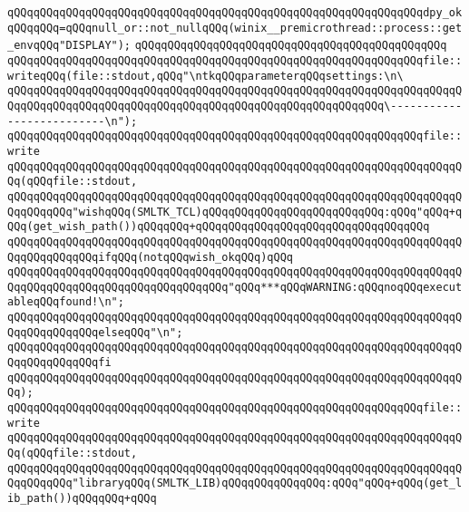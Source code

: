 \verb|qQQqqQQqqQQqqQQqqQQqqQQqqQQqqQQqqQQqqQQqqQQqqQQqqQQqqQQqqQQqqQQqdpy_okqQQqqQQq=qQQqnull_or::not_nullqQQq(winix__premicrothread::process::get_envqQQq"DISPLAY");|\newline
\verb|qQQqqQQqqQQqqQQqqQQqqQQqqQQqqQQqqQQqqQQqqQQqqQQq|\newline
\verb|qQQqqQQqqQQqqQQqqQQqqQQqqQQqqQQqqQQqqQQqqQQqqQQqqQQqqQQqqQQqqQQqfile::writeqQQq(file::stdout,qQQq"\ntkqQQqparameterqQQqsettings:\n\|\newline
\verb|qQQqqQQqqQQqqQQqqQQqqQQqqQQqqQQqqQQqqQQqqQQqqQQqqQQqqQQqqQQqqQQqqQQqqQQqqQQqqQQqqQQqqQQqqQQqqQQqqQQqqQQqqQQqqQQqqQQqqQQqqQQqqQQq\--------------------------\n");|\newline
\newline
\verb|qQQqqQQqqQQqqQQqqQQqqQQqqQQqqQQqqQQqqQQqqQQqqQQqqQQqqQQqqQQqqQQqfile::write|\newline
\verb|qQQqqQQqqQQqqQQqqQQqqQQqqQQqqQQqqQQqqQQqqQQqqQQqqQQqqQQqqQQqqQQqqQQqqQQq(qQQqfile::stdout,|\newline
\newline
\verb|qQQqqQQqqQQqqQQqqQQqqQQqqQQqqQQqqQQqqQQqqQQqqQQqqQQqqQQqqQQqqQQqqQQqqQQqqQQqqQQq"wishqQQq(SMLTK_TCL)qQQqqQQqqQQqqQQqqQQqqQQqqQQq:qQQq"qQQq+qQQq(get_wish_path())qQQqqQQq+qQQqqQQqqQQqqQQqqQQqqQQqqQQqqQQqqQQq|\newline
\verb|qQQqqQQqqQQqqQQqqQQqqQQqqQQqqQQqqQQqqQQqqQQqqQQqqQQqqQQqqQQqqQQqqQQqqQQqqQQqqQQqqQQqifqQQq(notqQQqwish_okqQQq)qQQq|\newline
\verb|qQQqqQQqqQQqqQQqqQQqqQQqqQQqqQQqqQQqqQQqqQQqqQQqqQQqqQQqqQQqqQQqqQQqqQQqqQQqqQQqqQQqqQQqqQQqqQQqqQQqqQQq"qQQq***qQQqWARNING:qQQqnoqQQqexecutableqQQqfound!\n";|\newline
\verb|qQQqqQQqqQQqqQQqqQQqqQQqqQQqqQQqqQQqqQQqqQQqqQQqqQQqqQQqqQQqqQQqqQQqqQQqqQQqqQQqqQQqelseqQQq"\n";|\newline
\verb|qQQqqQQqqQQqqQQqqQQqqQQqqQQqqQQqqQQqqQQqqQQqqQQqqQQqqQQqqQQqqQQqqQQqqQQqqQQqqQQqqQQqfi|\newline
\verb|qQQqqQQqqQQqqQQqqQQqqQQqqQQqqQQqqQQqqQQqqQQqqQQqqQQqqQQqqQQqqQQqqQQqqQQq);|\newline
\newline
\verb|qQQqqQQqqQQqqQQqqQQqqQQqqQQqqQQqqQQqqQQqqQQqqQQqqQQqqQQqqQQqqQQqfile::write|\newline
\verb|qQQqqQQqqQQqqQQqqQQqqQQqqQQqqQQqqQQqqQQqqQQqqQQqqQQqqQQqqQQqqQQqqQQqqQQq(qQQqfile::stdout,|\newline
\newline
\verb|qQQqqQQqqQQqqQQqqQQqqQQqqQQqqQQqqQQqqQQqqQQqqQQqqQQqqQQqqQQqqQQqqQQqqQQqqQQqqQQq"libraryqQQq(SMLTK_LIB)qQQqqQQqqQQqqQQq:qQQq"qQQq+qQQq(get_lib_path())qQQqqQQq+qQQq|\newline

